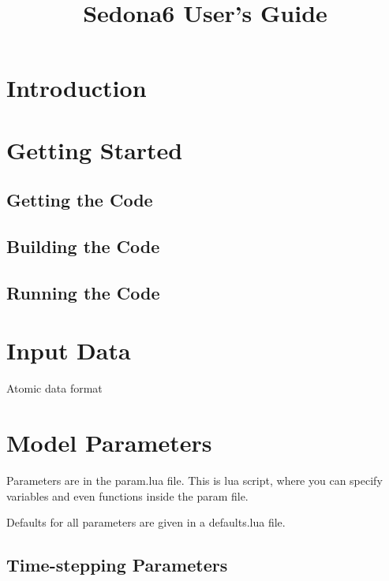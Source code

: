 \documentclass[11pt,letterpaper]{article}
\begin{document}
\title{Sedona6 User's Guide}
\maketitle

\section{Introduction}

\section{Getting Started}

\subsection{Getting the Code}

\subsection{Building the Code}


\subsection{Running the Code}




\section{Input Data}

Atomic data format

\section{Model Parameters}

Parameters are in the param.lua file. This is lua script, where you can specify variables and even functions inside the param file.

Defaults for all parameters are given in a defaults.lua file. 

\subsection{Time-stepping Parameters}
\end{document}
